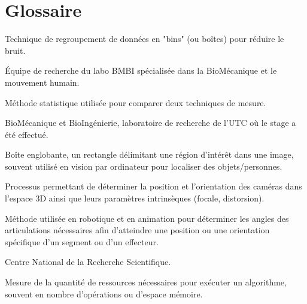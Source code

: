 \chapter*{Glossaire} %

\begin{description}
    \setlength{\itemsep}{1em} %

    \item[\textbf{\underline{Binning}}] 
    Technique de regroupement de données en "bins" (ou boîtes) pour réduire le bruit.

    \item[\textbf{\underline{BioMov-E}}] 
    Équipe de recherche du labo BMBI spécialisée dans la BioMécanique et le mouvement humain.

    \item[\textbf{\underline{Bland-Altman}}] 
    Méthode statistique utilisée pour comparer deux techniques de mesure.

    \item[\textbf{\underline{BMBI}}] 
    BioMécanique et BioIngénierie, laboratoire de recherche de l'UTC où le stage a été effectué.

    \item[\textbf{\underline{Bounding box}}] 
    Boîte englobante, un rectangle délimitant une région d'intérêt dans une image, souvent utilisé en vision par ordinateur pour localiser des objets/personnes.

    \item[\textbf{\underline{Calibration}}] 
    Processus permettant de déterminer la position et l'orientation des caméras dans l'espace 3D ainsi que leurs paramètres intrinsèques (focale, distorsion).

    \item[\textbf{\underline{Cinématique Inversée}}] 
    Méthode utilisée en robotique et en animation pour déterminer les angles des articulations nécessaires afin d'atteindre une position ou une orientation spécifique d'un segment ou d'un effecteur.

    \item[\textbf{\underline{CNRS}}] 
    Centre National de la Recherche Scientifique.

    \item[\textbf{\underline{Complexité computationnelle}}] 
    Mesure de la quantité de ressources nécessaires pour exécuter un algorithme, souvent en nombre d'opérations ou d'espace mémoire.


\end{description}
